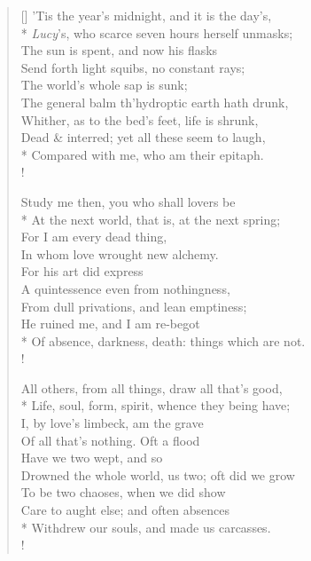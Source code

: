 \documentclass[MAIN]{subfiles}
\begin{document}
\settowidth{\versewidth}{'Tis the year's midnight, and it is the day's,}
\begin{verse}[\versewidth]
'Tis the year's midnight, and it is the day's,\\*
\emph{Lucy}'s, who scarce seven hours herself unmasks;\\
\vin The sun is spent, and now his flasks\\
\vin Send forth light squibs, no constant rays;\\
\vin \vin The world's whole sap is sunk;\\
The general balm th'hydroptic earth hath drunk,\\
Whither, as to the bed's feet, life is shrunk,\\
Dead \& interred; yet all these seem to laugh,\\*
Compared with me, who am their epitaph.\\!

Study me then, you who shall lovers be\\*
At the next world, that is, at the next spring;\\
\vin For I am every dead thing,\\
\vin In whom love wrought new alchemy.\\
\vin \vin For his art did express\\
A quintessence even from nothingness,\\
From dull privations, and lean emptiness;\\
He ruined me, and I am re-begot\\*
Of absence, darkness, death: things which are not.\\!

All others, from all things, draw all that's good,\\*
Life, soul, form, spirit, whence they being have;\\
\vin I, by love's limbeck, am the grave\\
\vin Of all that's nothing. Oft a flood\\
\vin \vin Have we two wept, and so\\
Drowned the whole world, us two; oft did we grow\\
To be two chaoses, when we did show\\
Care to aught else; and often absences\\*
Withdrew our souls, and made us carcasses.\\!


\end{verse}
\end{document}
